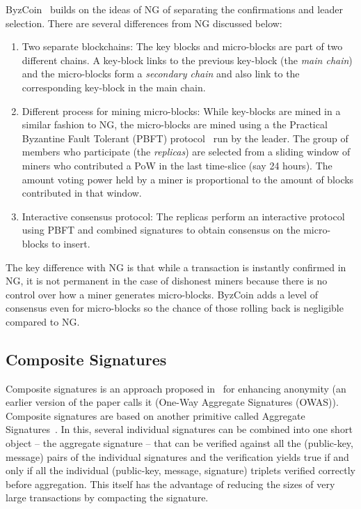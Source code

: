 \documentclass[]{report}   %
\begin{document}
ByzCoin~\cite{kokorisposter} builds on the ideas of NG of separating the confirmations and leader selection. There are several differences from NG discussed below:
\begin{enumerate}
	\item Two separate blockchains: The key blocks and micro-blocks are part of two different chains. A key-block links to the previous key-block (the {\em main chain}) and the micro-blocks form a {\em secondary chain} and also link to the corresponding key-block in the main chain. 
	\item Different process for mining micro-blocks: While key-blocks are mined in a similar fashion to NG, the micro-blocks are mined using a the Practical Byzantine Fault Tolerant (PBFT) protocol~\cite{castro1999practical} run by the leader. The group of members who participate (the {\em replicas}) are selected from a sliding window of miners who contributed a PoW in the last time-slice (say 24 hours). The amount voting power held by a miner is proportional to the amount of blocks contributed in that window.
	\item Interactive consensus protocol: The replicas perform an interactive protocol using PBFT and combined signatures to obtain consensus on the micro-blocks to insert.
\end{enumerate}

The key difference with NG is that while a transaction is instantly confirmed in NG, it is not permanent in the case of dishonest miners because there is no control over how a miner generates micro-blocks. ByzCoin adds a level of consensus even for micro-blocks so the chance of those rolling back is negligible compared to NG.

\subsection{Composite Signatures}

Composite signatures is an approach proposed in~\cite{saxena2014increasing} for enhancing anonymity (an earlier version of the paper calls it (One-Way Aggregate Signatures (OWAS)). Composite signatures are based on another primitive called Aggregate Signatures~\cite{boneh2003aggregate}. In this, several individual signatures can be combined into one short object -- the aggregate signature -- that can be verified against all the (public-key, message) pairs of the individual signatures and the verification yields true if and only if all the individual (public-key, message, signature) triplets verified correctly before aggregation. This itself has the advantage of reducing the sizes of very large transactions by compacting the signature. 
\end{document}
